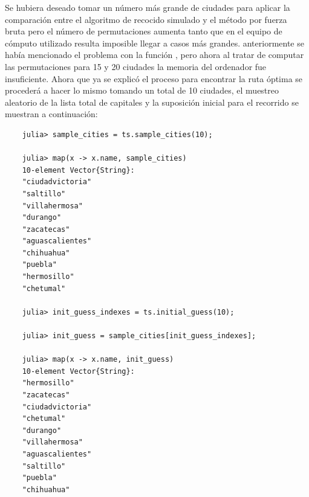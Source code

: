 Se hubiera deseado tomar un número más grande de ciudades para aplicar la comparación entre el algoritmo de recocido simulado y el método por fuerza bruta pero el número de permutaciones aumenta tanto que en el equipo de cómputo utilizado resulta imposible llegar a casos más grandes. anteriormente se había mencionado el problema con la función , pero ahora al tratar de computar las permutaciones para 15 y 20 ciudades la memoria del ordenador fue insuficiente. Ahora que ya se explicó el proceso para encontrar la ruta óptima se procederá a hacer lo mismo tomando un total de 10 ciudades, el muestreo aleatorio de la lista total de capitales y la suposición inicial para el recorrido se muestran a continuación:
\begin{verbatim}
    julia> sample_cities = ts.sample_cities(10);

    julia> map(x -> x.name, sample_cities)
    10-element Vector{String}:
    "ciudadvictoria"
    "saltillo"
    "villahermosa"
    "durango"
    "zacatecas"
    "aguascalientes"
    "chihuahua"
    "puebla"
    "hermosillo"
    "chetumal"

    julia> init_guess_indexes = ts.initial_guess(10);

    julia> init_guess = sample_cities[init_guess_indexes];

    julia> map(x -> x.name, init_guess)
    10-element Vector{String}:
    "hermosillo"
    "zacatecas"
    "ciudadvictoria"
    "chetumal"
    "durango"
    "villahermosa"
    "aguascalientes"
    "saltillo"
    "puebla"
    "chihuahua"
\end{verbatim}

